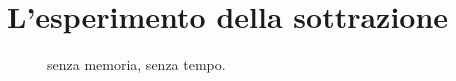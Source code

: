 %
%
%
%
%
%

\section{L'esperimento della sottrazione}

\begin{figure}[htbp]
\begin{center}
\caption{senza memoria, senza tempo.}
\label{slide7}
\end{center}
\end{figure}

